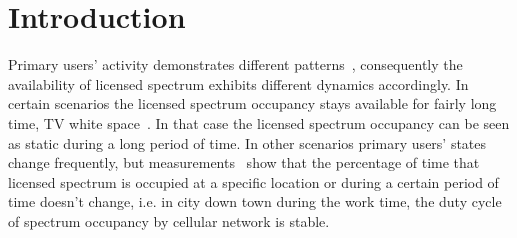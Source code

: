 
\section{Introduction}
\label{introduction}

Primary users' activity demonstrates different patterns~\cite{commag-Khalife08}, consequently the availability of licensed spectrum exhibits different dynamics accordingly.
In certain scenarios the licensed spectrum occupancy stays available for fairly long time, \eg TV white space~\cite{SenseLess2011}.
In that case the licensed spectrum occupancy can be seen as static during a long period of time.
In other scenarios primary users' states change frequently, but measurements~\cite{Wellens200910, measurement_Palaios14} show that the percentage of time that licensed spectrum is occupied at a specific location or during a certain period of time doesn’t change, i.e. in city down town during the work time, the duty cycle of spectrum occupancy by cellular network is stable.

